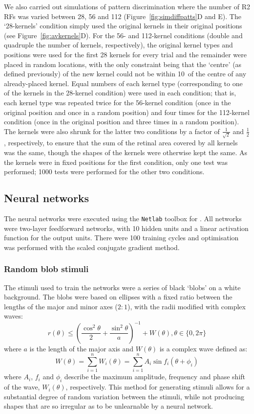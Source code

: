 We also carried out simulations of pattern discrimination where the number of R2 RFs was varied between 28, 56 and 112 (Figure~\ref{fig:simdiffpatts}D and E).
The `28-kernels' condition simply used the original kernels in their original positions (see Figure~\ref{fig:avkernels}D).
For the 56- and 112-kernel conditions (double and quadruple the number of kernels, respectively), the original kernel types and positions were used for the first 28 kernels for every trial and the remainder were placed in random locations, with the only constraint being that the `centre' (as defined previously) of the new kernel could not be within 10\degree\ of the centre of any already-placed kernel.
Equal numbers of each kernel type (corresponding to one of the kernels in the 28-kernel condition) were used in each condition; that is, each kernel type was repeated twice for the 56-kernel condition (once in the original position and once in a random position) and four times for the 112-kernel condition (once in the original position and three times in a random position).
The kernels were also shrunk for the latter two conditions by a factor of $\frac{1}{\sqrt{2}}$ and $\frac{1}{2}$, respectively, to ensure that the sum of the retinal area covered by all kernels was the same, though the shapes of the kernels were otherwise kept the same.
As the kernels were in fixed positions for the first condition, only one test was performed; 1000 tests were performed for the other two conditions.

\subsection*{Neural networks}
\label{sec:methods:neuralnetworks}
The neural networks were executed using the \texttt{Netlab} toolbox for \Matlab.
All networks were two-layer feedforward networks, with 10 hidden units and a linear activation function for the output units.
There were 100 training cycles and optimisation was performed with the scaled conjugate gradient method.

\subsubsection*{Random blob stimuli}
\label{sec:methods:stimuli}
The stimuli used to train the networks were a series of black `blobs' on a white background.
The blobs were based on ellipses with a fixed ratio between the lengths of the major and minor axes ($2:1$), with the radii modified with complex waves:
$$
r(\theta) \le \left(\frac{\cos^2 \theta}{2} + \frac{\sin^2 \theta}{a} \right)^{-1} + W(\theta), \theta \in \{0, 2\pi\}
$$
where $a$ is the length of the major axis and $W(\theta)$ is a complex wave defined as:
$$
W(\theta) = \sum_{i=1}^n W_i(\theta) = \sum_{i=1}^n A_i \sin f_i (\theta+\phi_i) 
$$
where $A_i$, $f_i$ and $\phi_i$ describe the maximum amplitude, frequency and phase shift of the wave, $W_i(\theta)$, respectively.
This method for generating stimuli allows for a substantial degree of random variation between the stimuli, while not producing shapes that are so irregular as to be unlearnable by a neural network.


